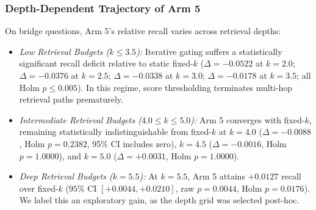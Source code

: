 \documentclass{article}
\begin{document}
\subsubsection{Depth-Dependent Trajectory of Arm 5}
On bridge questions, Arm 5's relative recall varies across retrieval depths:
\begin{itemize}
    \item \textit{Low Retrieval Budgets ($k \le 3.5$):} Iterative gating suffers a statistically significant recall deficit relative to static fixed-$k$ ($\Delta = -0.0522$ at $k=2.0$; $\Delta = -0.0376$ at $k=2.5$; $\Delta = -0.0338$ at $k=3.0$; $\Delta = -0.0178$ at $k=3.5$; all Holm $p \le 0.005$). In this regime, score thresholding terminates multi-hop retrieval paths prematurely.
    \item \textit{Intermediate Retrieval Budgets ($4.0 \le k \le 5.0$):} Arm 5 converges with fixed-$k$, remaining statistically indistinguishable from fixed-$k$ at $k=4.0$ ($\Delta = -0.0088$, Holm $p = 0.2382$, 95\% CI includes zero), $k=4.5$ ($\Delta = -0.0016$, Holm $p = 1.0000$), and $k=5.0$ ($\Delta = +0.0031$, Holm $p = 1.0000$).
    \item \textit{Deep Retrieval Budgets ($k=5.5$):} At $k=5.5$, Arm 5 attains $+0.0127$ recall over fixed-$k$ ($95\%$ CI $[+0.0044, +0.0210]$, raw $p=0.0044$, Holm $p=0.0176$). We label this an exploratory gain, as the depth grid was selected post-hoc.
\end{itemize}
\end{document}
